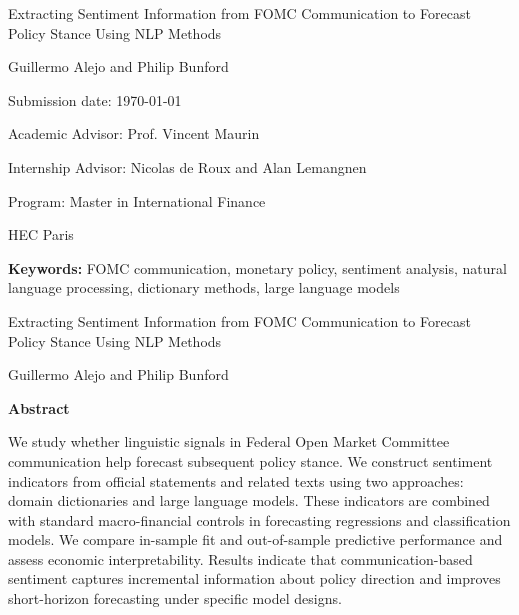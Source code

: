 \documentclass[11pt]{article}
\begin{document}
\begin{titlepage}
  \centering
  \vspace*{0.12\textheight}

  {\LARGE Extracting Sentiment Information from FOMC Communication to Forecast Policy Stance Using NLP Methods\par}
  \vspace{0.9cm}

  {\large Guillermo Alejo and Philip Bunford\par}
  \vspace{0.15cm}
  {\large Submission date: \today\par}
  \vspace{0.15cm}
  {\large Academic Advisor: Prof. Vincent Maurin \par}
  \vspace{0.15cm}
  {\large Internship Advisor: Nicolas de Roux and Alan Lemangnen\par}
  \vspace{0.15cm}
  {\large Program: Master in International Finance \par}
  \vspace{0.15cm}

  {\large HEC Paris\par}
  
  

  \vfill
  \textbf{Keywords:} FOMC communication, monetary policy, sentiment analysis, natural language processing, dictionary methods, large language models\footnotemark[1]\footnotemark[2]
\end{titlepage}

\begingroup
\renewcommand\thefootnote{\fnsymbol{footnote}}
\endgroup
\setcounter{footnote}{0}

\thispagestyle{plain}
\begin{center}
  {\Large Extracting Sentiment Information from FOMC Communication to Forecast Policy Stance Using NLP Methods\par}
  \vspace{0.35cm}
  {\large Guillermo Alejo and Philip Bunford\par}
\end{center}

\textbf{Abstract}

We study whether linguistic signals in Federal Open Market Committee communication help forecast subsequent policy stance. We construct sentiment indicators from official statements and related texts using two approaches: domain dictionaries and large language models. These indicators are combined with standard macro-financial controls in forecasting regressions and classification models. We compare in-sample fit and out-of-sample predictive performance and assess economic interpretability. Results indicate that communication-based sentiment captures incremental information about policy direction and improves short-horizon forecasting under specific model designs.
\end{document}
